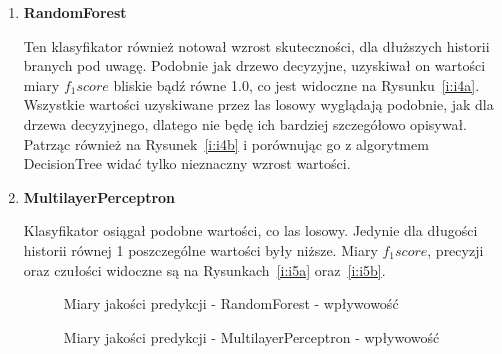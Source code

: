 \documentclass[polish,12pt]{aghthesis}
\begin{document}
\begin{enumerate}
\begin{figure}[ht]
\end{figure}

\FloatBarrier
    
    
    \item \textbf{RandomForest}
    
    Ten klasyfikator również notował wzrost skuteczności, dla dłuższych historii branych pod uwagę. Podobnie jak drzewo decyzyjne, uzyskiwał on wartości miary \textit{$f_1 score$} bliskie bądź równe 1.0, co jest widoczne na Rysunku~\ref{i:i4a}. Wszystkie wartości uzyskiwane przez las losowy wyglądają podobnie, jak dla drzewa decyzyjnego, dlatego nie będę ich bardziej szczegółowo opisywał. Patrząc również na Rysunek~\ref{i:i4b} i porównując go z algorytmem DecisionTree widać tylko nieznaczny wzrost wartości.
    
    \item \textbf{MultilayerPerceptron}
    
    Klasyfikator osiągał podobne wartości, co las losowy. Jedynie dla długości historii równej 1 poszczególne wartości były niższe. Miary \textit{$f_1 score$}, precyzji oraz czułości widoczne są na Rysunkach~\ref{i:i5a} oraz~\ref{i:i5b}.
    
        \begin{figure}[ht] 
    \centering
    \hfill%
    \caption{Miary jakości predykcji - RandomForest - wpływowość}
    \label{i:i4}
    \end{figure}
    
\FloatBarrier
    

    
         \begin{figure}[ht] 
    \centering
    \hfill%
    \label{i:i5}
    \caption{Miary jakości predykcji - MultilayerPerceptron - wpływowość}
\end{figure}

\FloatBarrier

\end{enumerate}
\end{document}
